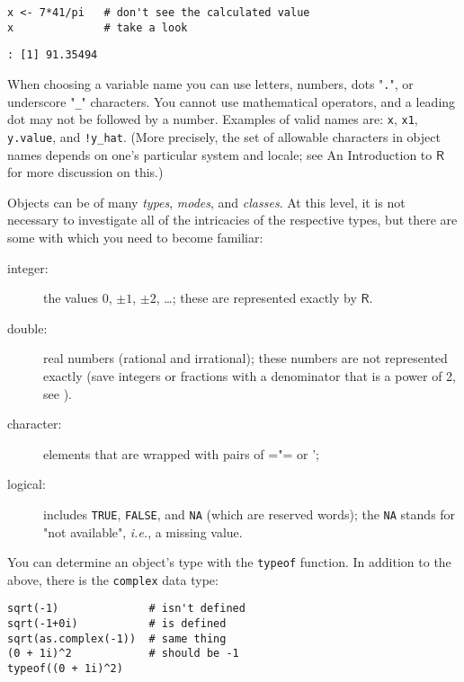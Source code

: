 \begin{verbatim}
x <- 7*41/pi   # don't see the calculated value
x              # take a look
\end{verbatim}

\begin{verbatim}
: [1] 91.35494
\end{verbatim}

When choosing a variable name you can use letters, numbers, dots
"\texttt{.}", or underscore "\texttt{\_}" characters. You cannot
use mathematical operators, and a leading dot may not be followed by a
number. Examples of valid names are: \texttt{x}, \texttt{x1}, \texttt{y.value}, and
\texttt{!y\_hat}. (More precisely, the set of allowable characters in object
names depends on one's particular system and locale; see An
Introduction to \(\mathsf{R}\) for more discussion on this.)

Objects can be of many \emph{types}, \emph{modes}, and \emph{classes}. At this level,
it is not necessary to investigate all of the intricacies of the
respective types, but there are some with which you need to become
familiar:
\begin{description}
\item[{integer:}] the values \(0\), \(\pm1\), \(\pm2\), \ldots{}; these are
represented exactly by \(\mathsf{R}\).
\item[{double:}] real numbers (rational and irrational); these numbers are
not represented exactly (save integers or fractions with
a denominator that is a power of 2, see
\cite{Venables2010}).
\item[{character:}] elements that are wrapped with pairs of ="= or ';
\item[{logical:}] includes \texttt{TRUE}, \texttt{FALSE}, and \texttt{NA} (which are reserved
words); the \texttt{NA}  stands
for "not available", \emph{i.e.}, a missing value.
\end{description}

You can determine an object's type with the \texttt{typeof}
 function. In addition to the above,
there is the \texttt{complex} 
 data type:

\begin{verbatim}
sqrt(-1)              # isn't defined
sqrt(-1+0i)           # is defined
sqrt(as.complex(-1))  # same thing
(0 + 1i)^2            # should be -1
typeof((0 + 1i)^2)
\end{verbatim}

